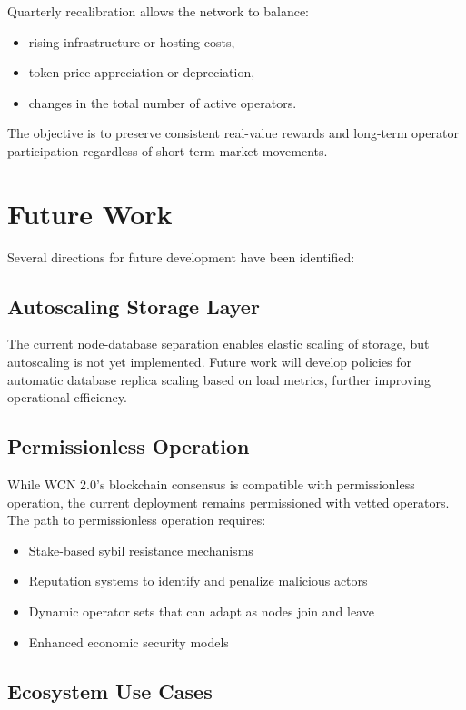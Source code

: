 \documentclass[10pt,twocolumn]{article}
\begin{document}
Quarterly recalibration allows the network to balance:
\begin{itemize}
    \item rising infrastructure or hosting costs,
    \item token price appreciation or depreciation,
    \item changes in the total number of active operators.
\end{itemize}
The objective is to preserve consistent real-value rewards and long-term operator participation regardless of short-term market movements.

\section{Future Work}

Several directions for future development have been identified:

\subsection{Autoscaling Storage Layer}

The current node-database separation enables elastic scaling of storage, but autoscaling is not yet implemented. Future work will develop policies for automatic database replica scaling based on load metrics, further improving operational efficiency.

\subsection{Permissionless Operation}

While WCN 2.0's blockchain consensus is compatible with permissionless operation, the current deployment remains permissioned with vetted operators. The path to permissionless operation requires:
\begin{itemize}
    \item Stake-based sybil resistance mechanisms
    \item Reputation systems to identify and penalize malicious actors
    \item Dynamic operator sets that can adapt as nodes join and leave
    \item Enhanced economic security models
\end{itemize}

\subsection{Ecosystem Use Cases}
\end{document}
